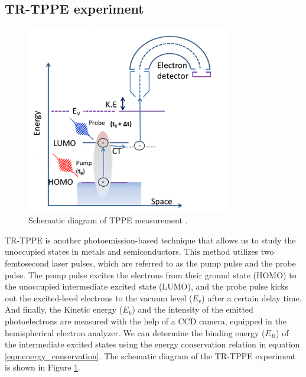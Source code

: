 \documentclass[12pt]{article}
\begin{document}
\subsection{TR-TPPE experiment}
\begin{figure}[H]
    \centering
    \includegraphics[width = 9cm]{TPPE scheme TIKA.png}
    \caption{Schematic diagram of TPPE measurement \cite{kafle2019role}.}
    \label{fig:TPPE scheme}
\end{figure}
TR-TPPE is another photoemission-based technique that allows us to study the unoccupied states in metals and semiconductors. This method utilizes two femtosecond laser pulses, which are referred to as the pump pulse and the probe pulse. The pump pulse excites the electrons from their ground state (HOMO) to the unoccupied intermediate excited state (LUMO), and the probe pulse kicks out the excited-level electrons to the vacuum level ($E_v$) after a certain delay time. And finally, the Kinetic energy ($E_k$) and the intensity of the emitted photoelectrons are measured with the help of a CCD camera, equipped in the hemispherical electron analyzer. We can determine the binding energy ($E_B$) of the intermediate excited states using the energy conservation relation in equation \ref{eqn:energy_conservation}. The schematic diagram of the TR-TPPE experiment is shown in Figure \ref{fig:TPPE scheme}.
\end{document}
